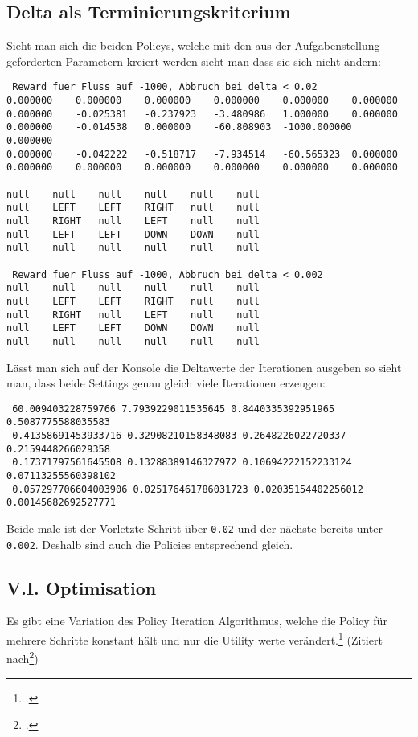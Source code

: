 \documentclass[a4paper]{article}
\begin{document}
\subsection{Delta als Terminierungskriterium}
Sieht man sich die beiden Policys, welche mit den aus der Aufgabenstellung geforderten Parametern kreiert werden sieht man dass sie sich nicht ändern:
\begin{lstlisting}
 Reward fuer Fluss auf -1000, Abbruch bei delta < 0.02
0.000000 	0.000000 	0.000000 	0.000000 	0.000000 	0.000000 	
0.000000 	-0.025381 	-0.237923 	-3.480986 	1.000000 	0.000000 	
0.000000 	-0.014538 	0.000000 	-60.808903 	-1000.000000 	0.000000 	
0.000000 	-0.042222 	-0.518717 	-7.934514 	-60.565323 	0.000000 	
0.000000 	0.000000 	0.000000 	0.000000 	0.000000 	0.000000 	

null	null	null	null	null	null	
null	LEFT	LEFT	RIGHT	null	null	
null	RIGHT	null	LEFT	null	null	
null	LEFT	LEFT	DOWN	DOWN	null	
null	null	null	null	null	null	

 Reward fuer Fluss auf -1000, Abbruch bei delta < 0.002
null	null	null	null	null	null	
null	LEFT	LEFT	RIGHT	null	null	
null	RIGHT	null	LEFT	null	null	
null	LEFT	LEFT	DOWN	DOWN	null	
null	null	null	null	null	null	

\end{lstlisting}
Lässt man sich auf der Konsole die Deltawerte der Iterationen ausgeben so sieht man, dass beide Settings genau gleich viele Iterationen erzeugen:
\begin{lstlisting}
 60.009403228759766 7.7939229011535645 0.8440335392951965 0.5087775588035583
 0.41358691453933716 0.32908210158348083 0.2648226022720337 0.2159448266029358
 0.17371797561645508 0.13288389146327972 0.10694222152233124 0.07113255560398102
 0.057297706604003906 0.025176461786031723 0.02035154402256012 0.00145682692527771
\end{lstlisting}

Beide male ist der Vorletzte Schritt über \texttt{0.02} und der nächste bereits unter \texttt{0.002}. Deshalb sind auch die Policies entsprechend gleich.
\lstset{numbers=left}

\subsection{V.I. Optimisation}
Es gibt eine Variation des Policy Iteration Algorithmus, welche die Policy für mehrere Schritte konstant hält und nur die Utility werte verändert.\footcite{
Martin L. Puterman and Moon Chirl Shin. Modified policy iteration algorithms for discounted Markov decision processes. Management Science, 24:1127-1137, 1978.}
(Zitiert nach\footcite{https://www.cs.cmu.edu/afs/cs/project/jair/pub/volume4/kaelbling96a-html/node21.html})
\end{document}
